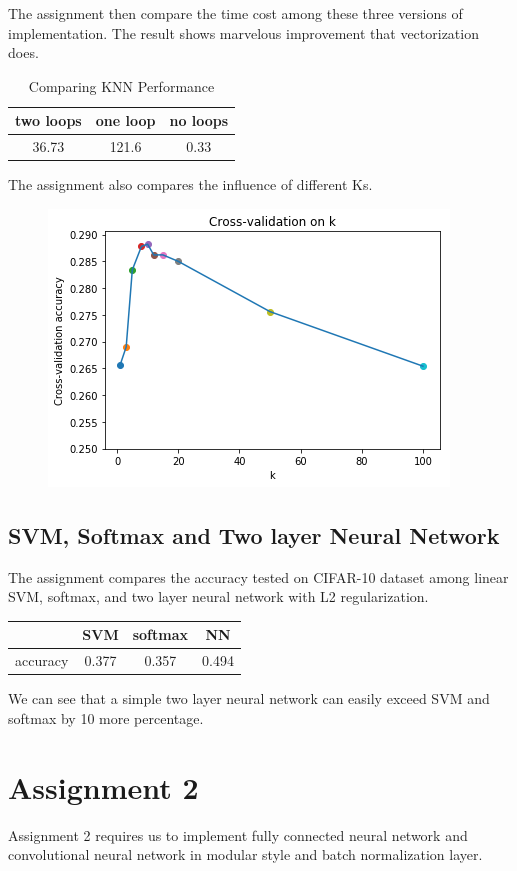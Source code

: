 \documentclass{article} %
\begin{document}
The assignment then compare the time cost among these three versions of implementation. The result shows marvelous improvement that vectorization does.
\begin{table}[h]
	\centering
	\begin{tabular}{c|c|c}
		\hline
		two loops & one loop & no loops\\
		\hline
		36.73 & 121.6 & 0.33\\
		\hline
	\end{tabular}
	\caption{Comparing KNN Performance}
\end{table}

The assignment also compares the influence of different Ks.
\begin{figure}[h]
	\centering
	\includegraphics[width=.5\textwidth]{knn-k.png}
\end{figure}

\subsection{SVM, Softmax and Two layer Neural Network}
The assignment compares the accuracy tested on CIFAR-10 dataset among linear SVM, softmax, and two layer neural network with L2 regularization.
\begin{table}[H]
	\centering
	\begin{tabular}{c|c|c|c}
		\hline
		& SVM & softmax & NN\\
		\hline
		accuracy & 0.377 & 0.357 & 0.494\\
		\hline
	\end{tabular}
\end{table}
We can see that a simple two layer neural network can easily exceed SVM and softmax by 10 more percentage.


\section{Assignment 2}
Assignment 2 requires us to implement fully connected neural network and convolutional neural network in modular style and batch normalization layer.
\end{document}
